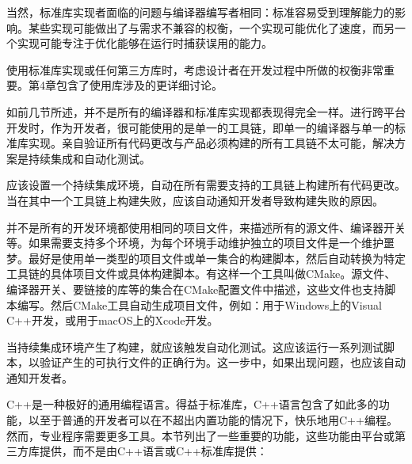 当然，标准库实现者面临的问题与编译器编写者相同：标准容易受到理解能力的影响。某些实现可能做出了与需求不兼容的权衡，一个实现可能优化了速度，而另一个实现可能专注于优化能够在运行时捕获误用的能力。

使用标准库实现或任何第三方库时，考虑设计者在开发过程中所做的权衡非常重要。第4章包含了使用库涉及的更详细讨论。


如前几节所述，并不是所有的编译器和标准库实现都表现得完全一样。进行跨平台开发时，作为开发者，很可能使用的是单一的工具链，即单一的编译器与单一的标准库实现。亲自验证所有代码更改与产品必须构建的所有工具链不太可能，解决方案是持续集成和自动化测试。

应该设置一个持续集成环境，自动在所有需要支持的工具链上构建所有代码更改。当在其中一个工具链上构建失败，应该自动通知开发者导致构建失败的原因。

并不是所有的开发环境都使用相同的项目文件，来描述所有的源文件、编译器开关等。如果需要支持多个环境，为每个环境手动维护独立的项目文件是一个维护噩梦。最好是使用单一类型的项目文件或单一集合的构建脚本，然后自动转换为特定工具链的具体项目文件或具体构建脚本。有这样一个工具叫做CMake。源文件、编译器开关、要链接的库等的集合在CMake配置文件中描述，这些文件也支持脚本编写。然后CMake工具自动生成项目文件，例如：用于Windows上的Visual C++开发，或用于macOS上的Xcode开发。

当持续集成环境产生了构建，就应该触发自动化测试。这应该运行一系列测试脚本，以验证产生的可执行文件的正确行为。这一步中，如果出现问题，也应该自动通知开发者。


C++是一种极好的通用编程语言。得益于标准库，C++语言包含了如此多的功能，以至于普通的开发者可以在不超出内置功能的情况下，快乐地用C++编程。然而，专业程序需要更多工具。本节列出了一些重要的功能，这些功能由平台或第三方库提供，而不是由C++语言或C++标准库提供：


